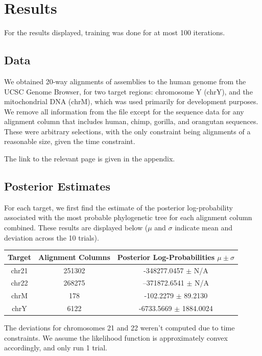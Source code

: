 \documentclass[12pt]{article}
\begin{document}
    \section{Results}
        For the results displayed, training was done for at most 100 iterations.
        \subsection{Data}
        We obtained 20-way alignments of assemblies to the human genome from the UCSC Genome Browser, for two target regions: chromosome Y (chrY), and the mitochondrial DNA (chrM), which was used primarily for development purposes. We remove all information from the file except for the sequence data for any alignment column that includes human, chimp, gorilla, and orangutan sequences. These were arbitrary selections, with the only constraint being alignments of a reasonable size, given the time constraint.

        The link to the relevant page is given in the appendix.
        \subsection{Posterior Estimates}
        For each target, we first find the estimate of the posterior log-probability associated with the most probable phylogenetic tree for each alignment column combined. These results are displayed below ($\mu$ and $\sigma$ indicate mean and deviation across the 10 trials).
        \begin{center}
        \begin{tabular}{ |c|c|c| } \hline
        Target & Alignment Columns & Posterior Log-Probabilities $\mu \pm \sigma$ \\ \hline 
        chr21 & 251302 & -348277.0457 $\pm$ N/A \\ \hline
        chr22 & 268275 & --371872.6541 $\pm$ N/A \\ \hline
        chrM & 178 & -102.2279 $\pm$ 89.2130 \\ \hline
        chrY & 6122 & -6733.5669 $\pm$ 1884.0024 \\ \hline
        \end{tabular}
        \end{center}
        The deviations for chromosomes 21 and 22 weren't computed due to time constraints. We assume the likelihood function is approximately convex accordingly, and only run 1 trial.
\end{document}

